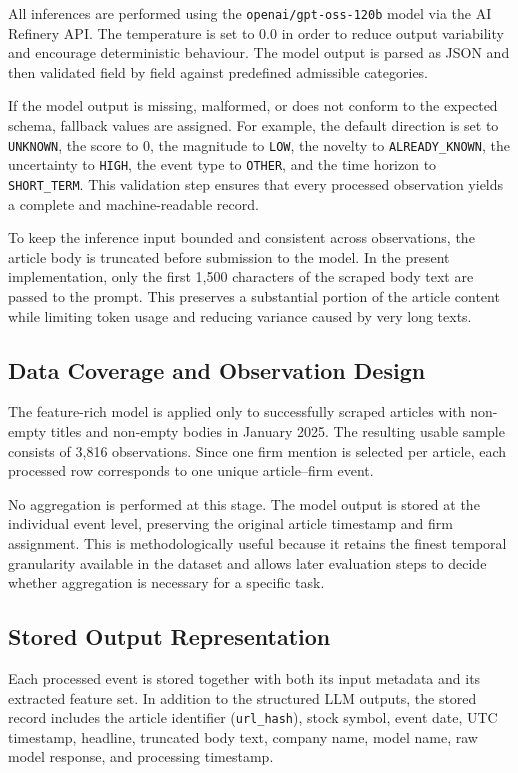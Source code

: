 All inferences are performed using the \texttt{openai/gpt-oss-120b} model via the AI Refinery API. The temperature is set to 0.0 in order to reduce output variability and encourage deterministic behaviour. The model output is parsed as JSON and then validated field by field against predefined admissible categories.

If the model output is missing, malformed, or does not conform to the expected schema, fallback values are assigned. For example, the default direction is set to \texttt{UNKNOWN}, the score to \(0\), the magnitude to \texttt{LOW}, the novelty to \texttt{ALREADY\_KNOWN}, the uncertainty to \texttt{HIGH}, the event type to \texttt{OTHER}, and the time horizon to \texttt{SHORT\_TERM}. This validation step ensures that every processed observation yields a complete and machine-readable record.

To keep the inference input bounded and consistent across observations, the article body is truncated before submission to the model. In the present implementation, only the first 1,500 characters of the scraped body text are passed to the prompt. This preserves a substantial portion of the article content while limiting token usage and reducing variance caused by very long texts.

\subsection{Data Coverage and Observation Design}

The feature-rich model is applied only to successfully scraped articles with non-empty titles and non-empty bodies in January 2025. The resulting usable sample consists of 3,816 observations. Since one firm mention is selected per article, each processed row corresponds to one unique article--firm event.

No aggregation is performed at this stage. The model output is stored at the individual event level, preserving the original article timestamp and firm assignment. This is methodologically useful because it retains the finest temporal granularity available in the dataset and allows later evaluation steps to decide whether aggregation is necessary for a specific task.

\subsection{Stored Output Representation}

Each processed event is stored together with both its input metadata and its extracted feature set. In addition to the structured LLM outputs, the stored record includes the article identifier (\texttt{url\_hash}), stock symbol, event date, UTC timestamp, headline, truncated body text, company name, model name, raw model response, and processing timestamp.

